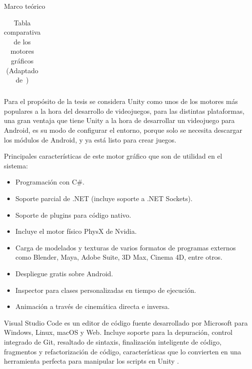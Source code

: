 \begin{thesischapter}{1} {Marco teórico}
\begin{table}[ht]
\begin{tabularx}{\textwidth}{|X|X|X|X|X|X|X|}
        \end{tabularx}
        \label{tab: graphics-engines}
        \caption{ Tabla comparativa de los motores gráficos \\ (Adaptado de~\cite{gonjar2019desarrollo})}
    \end{table}
    
    
    \vspace{10pt}
    Para el propósito de la tesis se considera Unity como unos de los motores más populares a la hora del desarrollo de videojuegos, para las distintas plataformas, una gran ventaja que tiene Unity a la hora de desarrollar un videojuego para Android, es su modo de configurar el entorno, porque solo se necesita descargar los módulos de Android, y ya está listo para crear juegos.

    \vspace{5pt}
    Principales características de este motor gráfico que son de utilidad en el sistema:~\cite{unity3d}

    \begin{itemize}
        \item Programación con C\#.
        \item Soporte parcial de .NET (incluye soporte a .NET Sockets).
        \item Soporte de plugins para código nativo.
        \item Incluye el motor físico PhysX de Nvidia.
        \item Carga de modelados y texturas de varios formatos de programas externos como Blender, Maya, Adobe Suite, 3D Max, Cinema 4D, entre otros.
        \item Despliegue gratis sobre Android.
        \item Inspector para clases personalizadas en tiempo de ejecución.
        \item Animación a través de cinemática directa e inversa.
    \end{itemize}

    Visual Studio Code es un editor de código fuente desarrollado por Microsoft para Windows, Linux, macOS y Web. Incluye soporte para la depuración, control integrado de Git, resaltado de sintaxis, finalización inteligente de código, fragmentos y refactorización de código, características que lo convierten en una herramienta perfecta para manipular los scripts en Unity \cite{vscode}.


\end{thesischapter}
